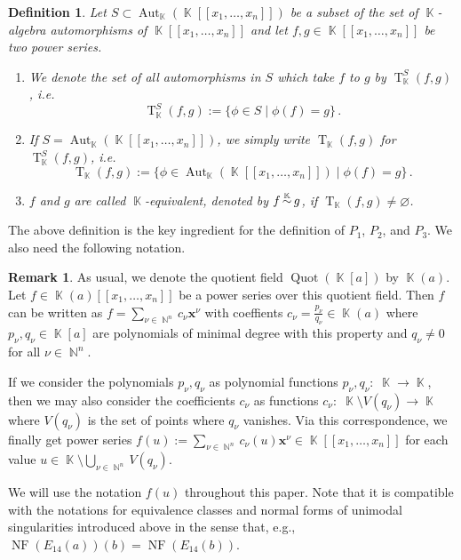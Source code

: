 \documentclass[noend]{amsproc}
\newtheorem{defn}[theorem]{Definition}
\theoremstyle{definition}
\newtheorem{remark}[theorem]{Remark}
\DeclareMathOperator{\ksim}{\mathrel{\smash{\overset{\K}{\sim}}}}
\DeclareMathOperator{\N}{\mathbb{N}}
\DeclareMathOperator{\K}{\mathbb{K}}
\DeclareMathOperator{\NF}{NF}
\DeclareMathOperator{\T}{T}
\DeclareMathOperator{\Aut}{Aut}
\DeclareMathOperator{\Quot}{Quot}
\begin{document}
\begin{defn}
Let $S \subset \Aut_{\K}(\K[[x_1,\ldots,x_n]])$ be a subset of the set of
$\K$-algebra automorphisms of $\K[[x_1, \ldots, x_n]]$ and let
$f, g \in \K[[x_1, \ldots, x_n]]$ be two power series.
\begin{enumerate}
\item We denote the set of all automorphisms in $S$ which take $f$ to $g$ by
$\T_{\K}^S(f,g)$, i.e.\@
\[
\T_{\K}^S(f,g):=\{\phi\in S\mid \phi(f)=g\}\,.
\]

\item If $S=\Aut_{\K}(\K[[x_1,\ldots,x_n]])$, we simply write
$\T_{\K}(f,g)$ for $\T_{\K}^S(f,g)$, i.e.\@
\[
\T_{\K}(f,g)
:= \{\phi \in \Aut_{\K}(\K[[x_1, \ldots, x_n]]) \mid \phi(f) = g \} \,.
\]

\item $f$ and $g$ are called $\K$-equivalent, denoted by
$f \ksim g$, if $\T_{\K}(f,g) \neq \varnothing$.
\end{enumerate}
\end{defn}

The above definition is the key ingredient for the definition of $P_1$, $P_2$,
and $P_3$. We also need the following notation.

\begin{remark}
As usual, we denote the quotient field
$\Quot(\K[a])$ by $\K(a)$. Let $f \in \K(a)[[x_1,\ldots,x_n]]$ be a power
series over this quotient field. Then $f$ can be written as
$f = \sum_{\nu \in \N^n} c_\nu \boldsymbol{x}^\nu$ with coeffients
$c_\nu = \frac{p_\nu}{q_\nu} \in \K(a)$ where $p_\nu, q_\nu \in \K[a]$ are
polynomials of minimal degree with this property and $q_\nu \neq 0$ for all
$\nu \in \N^n$.

If we consider the polynomials $p_\nu, q_\nu$ as polynomial functions
$p_\nu, q_\nu: \; \K \rightarrow \K$, then we may also consider the
coefficients $c_\nu$ as functions
$c_\nu: \; \K \setminus V(q_\nu) \rightarrow \K$ where $V(q_\nu)$ is the set of
points where $q_\nu$ vanishes. Via this correspondence, we finally get power
series
$f(u) := \sum_{\nu \in \N^n} c_\nu(u) \boldsymbol{x}^\nu
\in \K[[x_1,\ldots,x_n]]$ for each value
$u \in \K \setminus \bigcup_{\nu \in \N^n} V(q_\nu)$.

We will use the notation $f(u)$ throughout this paper. Note that it is
compatible with the notations for equivalence classes and normal forms of
unimodal singularities introduced above in the sense that, e.g.,
$\NF(E_{14}(a))(b) = \NF(E_{14}(b))$.
\end{remark}
\end{document}
